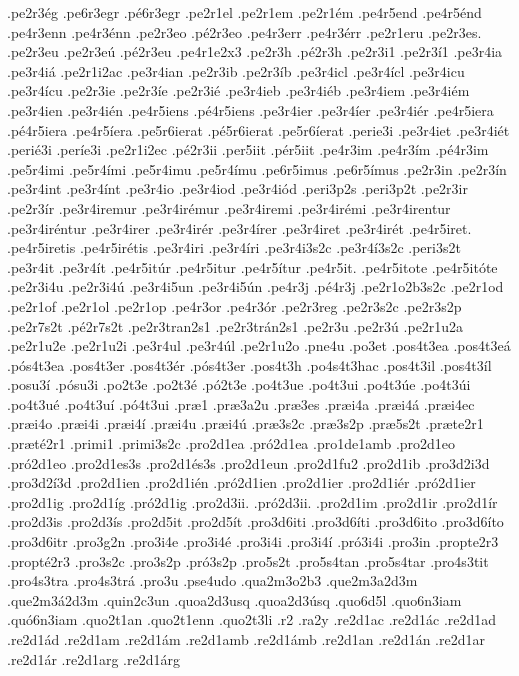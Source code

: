 {.pe2r3ég
.pe6r3egr
.pé6r3egr
.pe2r1el
.pe2r1em
.pe2r1ém
.pe4r5end
.pe4r5énd
.pe4r3enn
.pe4r3énn
.pe2r3eo
.pé2r3eo
.pe4r3err
.pe4r3érr
.pe2r1eru
.pe2r3es.
.pe2r3eu
.pe2r3eú
.pé2r3eu
.pe4r1e2x3
.pe2r3h
.pé2r3h
.pe2r3i1
.pe2r3í1
.pe3r4ia
.pe3r4iá
.pe2r1i2ac
.pe3r4ian
.pe2r3ib
.pe2r3íb
.pe3r4icl
.pe3r4ícl
.pe3r4icu
.pe3r4ícu
.pe2r3ie
.pe2r3íe
.pe2r3ié
.pe3r4ieb
.pe3r4iéb
.pe3r4iem
.pe3r4iém
.pe3r4ien
.pe3r4ién
.pe4r5iens
.pé4r5iens
.pe3r4ier
.pe3r4íer
.pe3r4iér
.pe4r5iera
.pé4r5iera
.pe4r5íera
.pe5r6ierat
.pé5r6ierat
.pe5r6íerat
.perie3i
.pe3r4iet
.pe3r4iét
.perié3i
.períe3i
.pe2r1i2ec
.pé2r3ii
.per5iit
.pér5iit
.pe4r3im
.pe4r3ím
.pé4r3im
.pe5r4imi
.pe5r4ími
.pe5r4imu
.pe5r4ímu
.pe6r5imus
.pe6r5ímus
.pe2r3in
.pe2r3ín
.pe3r4int
.pe3r4ínt
.pe3r4io
.pe3r4iod
.pe3r4iód
.peri3p2s
.peri3p2t
.pe2r3ir
.pe2r3ír
.pe3r4iremur
.pe3r4irémur
.pe3r4iremi
.pe3r4irémi
.pe3r4irentur
.pe3r4iréntur
.pe3r4irer
.pe3r4irér
.pe3r4írer
.pe3r4iret
.pe3r4irét
.pe4r5iret.
.pe4r5iretis
.pe4r5irétis
.pe3r4iri
.pe3r4íri
.pe3r4i3s2c
.pe3r4í3s2c
.peri3s2t
.pe3r4it
.pe3r4ít
.pe4r5itúr
.pe4r5itur
.pe4r5ítur
.pe4r5it.
.pe4r5itote
.pe4r5itóte
.pe2r3i4u
.pe2r3i4ú
.pe3r4i5un
.pe3r4i5ún
.pe4r3j
.pé4r3j
.pe2r1o2b3s2c
.pe2r1od
.pe2r1of
.pe2r1ol
.pe2r1op
.pe4r3or
.pe4r3ór
.pe2r3reg
.pe2r3s2c
.pe2r3s2p
.pe2r7s2t
.pé2r7s2t
.pe2r3tran2s1
.pe2r3trán2s1
.pe2r3u
.pe2r3ú
.pe2r1u2a
.pe2r1u2e
.pe2r1u2i
.pe3r4ul
.pe3r4úl
.pe2r1u2o
.pne4u
.po3et
.pos4t3ea
.pos4t3eá
.pós4t3ea
.pos4t3er
.pos4t3ér
.pós4t3er
.pos4t3h
.po4s4t3hac
.pos4t3il
.pos4t3íl
.posu3í
.pósu3i
.po2t3e
.po2t3é
.pó2t3e
.po4t3ue
.po4t3ui
.po4t3úe
.po4t3úi
.po4t3ué
.po4t3uí
.pó4t3ui
.præ1
.præ3a2u
.præ3es
.præi4a
.præi4á
.præi4ec
.præi4o
.præi4i
.præi4í
.præi4u
.præi4ú
.præ3s2c
.præ3s2p
.præ5s2t
.præte2r1
.præté2r1
.primi1
.primi3s2c
.pro2d1ea
.pró2d1ea
.pro1de1amb
.pro2d1eo
.pró2d1eo
.pro2d1es3s
.pro2d1és3s
.pro2d1eun
.pro2d1fu2
.pro2d1ib
.pro3d2i3d
.pro3d2í3d
.pro2d1ien
.pro2d1ién
.pró2d1ien
.pro2d1ier
.pro2d1iér
.pró2d1ier
.pro2d1ig
.pro2d1íg
.pró2d1ig
.pro2d3ii.
.pró2d3ii.
.pro2d1im
.pro2d1ir
.pro2d1ír
.pro2d3is
.pro2d3ís
.pro2d5it
.pro2d5ít
.pro3d6iti
.pro3d6íti
.pro3d6ito
.pro3d6íto
.pro3d6itr
.pro3g2n
.pro3i4e
.pro3i4é
.pro3i4i
.pro3i4í
.pró3i4i
.pro3in
.propte2r3
.propté2r3
.pro3s2c
.pro3s2p
.pró3s2p
.pro5s2t
.pro5s4tan
.pro5s4tar
.pro4s3tit
.pro4s3tra
.pro4s3trá
.pro3u
.pse4udo
.qua2m3o2b3
.que2m3a2d3m
.que2m3á2d3m
.quin2c3un
.quoa2d3usq
.quoa2d3úsq
.quo6d5l
.quo6n3iam
.quó6n3iam
.quo2t1an
.quo2t1enn
.quo2t3li
.r2
.ra2y
.re2d1ac
.re2d1ác
.re2d1ad
.re2d1ád
.re2d1am
.re2d1ám
.re2d1amb
.re2d1ámb
.re2d1an
.re2d1án
.re2d1ar
.re2d1ár
.re2d1arg
.re2d1árg
}
